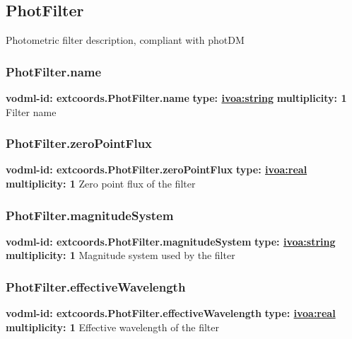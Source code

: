   \subsection{PhotFilter}
  \label{sect:extcoords.PhotFilter}
    Photometric filter description, compliant with photDM

    \subsubsection{PhotFilter.name}
      \textbf{vodml-id: extcoords.PhotFilter.name} \newline
      \textbf{type: \hyperref[sect:ivoa]{ivoa:string}} \newline
      \textbf{multiplicity: 1} \newline 
      Filter name

    \subsubsection{PhotFilter.zeroPointFlux}
      \textbf{vodml-id: extcoords.PhotFilter.zeroPointFlux} \newline
      \textbf{type: \hyperref[sect:ivoa]{ivoa:real}} \newline
      \textbf{multiplicity: 1} \newline 
      Zero point flux of the filter

    \subsubsection{PhotFilter.magnitudeSystem}
      \textbf{vodml-id: extcoords.PhotFilter.magnitudeSystem} \newline
      \textbf{type: \hyperref[sect:ivoa]{ivoa:string}} \newline
      \textbf{multiplicity: 1} \newline 
      Magnitude system used by the filter

    \subsubsection{PhotFilter.effectiveWavelength}
      \textbf{vodml-id: extcoords.PhotFilter.effectiveWavelength} \newline
      \textbf{type: \hyperref[sect:ivoa]{ivoa:real}} \newline
      \textbf{multiplicity: 1} \newline 
      Effective wavelength of the filter


